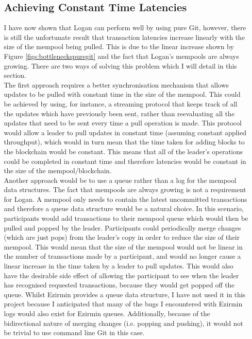 \documentclass[12pt,a4paper,twoside,openright]{report}
\begin{document}
	\subsection{Achieving Constant Time Latencies}\label{sect:bettersync}
	I have now shown that Logan can perform well by using pure Git, however, there is still the unfortunate result that transaction latencies increase linearly with the size of the mempool being pulled.
	This is due to the linear increase shown by Figure \ref{figs:bottleneckspuregit} and the fact that Logan's mempools are always growing. 
	There are two ways of solving this problem which I will detail in this section.\\

	The first approach requires a better synchronisation mechanism that allows updates to be pulled with constant time in the size of the mempool.
	This could be achieved by using, for instance, a streaming protocol that keeps track of all the updates which have previously been sent, rather than reevaluating all the updates that need to be sent every time a pull operation is made. 
	This protocol would allow a leader to pull updates in constant time (assuming constant applied throughput), which would in turn mean that the time taken for adding blocks to the blockchain would be constant.
	This means that all of the leader's operations could be completed in constant time and therefore latencies would be constant in the size of the mempool/blockchain. \\

	Another approach would be to use a queue rather than a log for the mempool data structures. 
	The fact that mempools are always growing is not a requirement for Logan.
	A mempool only needs to contain the latest uncommitted transactions and therefore a queue data structure would be a natural choice.
	In this scenario, participants would add transactions to their mempool queue which would then be pulled and popped by the leader.
	Participants could periodically merge changes (which are just pops) from the leader's copy in order to reduce the size of their mempool.
	This would mean that the size of the mempool would not be linear in the number of transactions made by a participant, and would no longer cause a linear increase in the time taken by a leader to pull updates.
	This would also have the desirable side effect of allowing the participant to see when the leader has recognised requested transactions, because they would get popped off the queue. 
	Whilst Ezirmin provides a queue data structure, I have not used it in this project because I anticipated that many of the bugs I encountered with Ezirmin logs would also exist for Ezirmin queues.
	Additionally, because of the bidirectional nature of merging changes (i.e. popping and pushing), it would not be trivial to use command line Git in this case. \\
\end{document}
